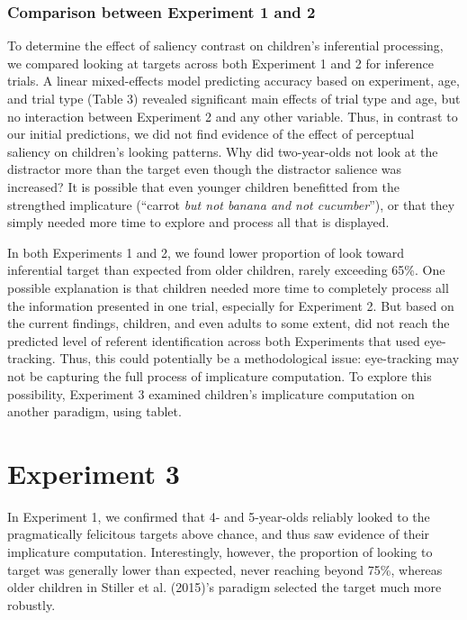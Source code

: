 \documentclass[a4paper,man,apacite,floatsintext]{apa6}
\begin{document}
\subsubsection{Comparison between Experiment 1 and
2}\label{comparison-between-experiment-1-and-2}

To determine the effect of saliency contrast on children's inferential
processing, we compared looking at targets across both Experiment 1 and
2 for inference trials. A linear mixed-effects model predicting accuracy
based on experiment, age, and trial type (Table 3) revealed significant
main effects of trial type and age, but no interaction between
Experiment 2 and any other variable. Thus, in contrast to our initial
predictions, we did not find evidence of the effect of perceptual
saliency on children's looking patterns. Why did two-year-olds not look
at the distractor more than the target even though the distractor
salience was increased? It is possible that even younger children
benefitted from the strengthed implicature (``carrot \emph{but not
banana and not cucumber}''), or that they simply needed more time to
explore and process all that is displayed.

In both Experiments 1 and 2, we found lower proportion of look toward
inferential target than expected from older children, rarely exceeding
65\%. One possible explanation is that children needed more time to
completely process all the information presented in one trial,
especially for Experiment 2. But based on the current findings,
children, and even adults to some extent, did not reach the predicted
level of referent identification across both Experiments that used
eye-tracking. Thus, this could potentially be a methodological issue:
eye-tracking may not be capturing the full process of implicature
computation. To explore this possibility, Experiment 3 examined
children's implicature computation on another paradigm, using tablet.

\section{Experiment 3}\label{experiment-3}

In Experiment 1, we confirmed that 4- and 5-year-olds reliably looked to
the pragmatically felicitous targets above chance, and thus saw evidence
of their implicature computation. Interestingly, however, the proportion
of looking to target was generally lower than expected, never reaching
beyond 75\%, whereas older children in Stiller et al. (2015)'s paradigm
selected the target much more robustly.
\end{document}
